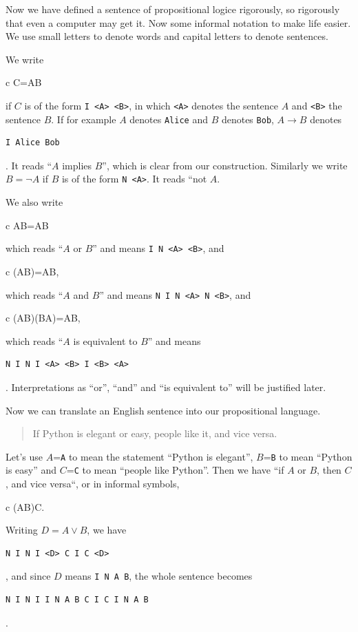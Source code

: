 \documentclass[11pt,oneside,%
]{memoir}
\newenvironment{eqna}{\begin{IEEEeqnarray}{c}}{\end{IEEEeqnarray}\ignorespacesafterend}
\theoremstyle{definition}
\begin{document}
Now we have defined a sentence of propositional logice rigorously, so rigorously that even a computer may get it. Now some informal notation to make life easier. We use small letters to denote words and capital letters to denote sentences.

We write
\begin{eqna}
    C=A\rightarrow B
\end{eqna}
if \(C\) is of the form \lstinline[language=propositio]!I <A> <B>!, in which \lstinline[language=propositio]!<A>! denotes the sentence \(A\) and \lstinline[language=propositio]!<B>! the sentence \(B\). If for example \(A\) denotes \lstinline[language=propositio]!Alice! and \(B\) denotes \lstinline[language=propositio]!Bob!, \(A\rightarrow B\) denotes
\begin{lstlisting}[language=propositio]
I Alice Bob
\end{lstlisting}
. It reads ``\(A\) implies \(B\)'', which is clear from our construction. Similarly we write \(B=\neg A\) if \(B\) is of the form \lstinline[language=propositio]!N <A>!. It reads ``not \(A\).

We also write
\begin{eqna}
    \neg A\rightarrow B=A\vee B
\end{eqna}
which reads ``\(A\) or \(B\)'' and means \lstinline[language=propositio]!I N <A> <B>!, and
\begin{eqna}
    \neg(\neg A\vee\neg B)=A\wedge B,
\end{eqna}
which reads ``\(A\) and \(B\)'' and means \lstinline[language=propositio]!N I N <A> N <B>!, and
\begin{eqna}
    (A\rightarrow B)\wedge(B\rightarrow A)=A\leftrightarrow B,
\end{eqna}
which reads ``\(A\) is equivalent to \(B\)'' and means
\begin{lstlisting}[language=propositio]
N I N I <A> <B> I <B> <A>
\end{lstlisting}
. Interpretations as ``or'', ``and'' and ``is equivalent to'' will be justified later.

Now we can translate an English sentence into our propositional language.
\begin{quote}
    If Python is elegant or easy, people like it, and vice versa.
\end{quote}
Let's use \(A\)=\lstinline[language=propositio]!A! to mean the statement ``Python is elegant'', \(B\)=\lstinline[language=propositio]!B! to mean ``Python is easy'' and \(C\)=\lstinline[language=propositio]!C! to mean ``people like Python''. Then we have ``if \(A\) or \(B\), then \(C\), and vice versa``, or in informal symbols,
\begin{eqna}
    (A\vee B)\leftrightarrow C.
\end{eqna}
Writing \(D=A\vee B\), we have
\begin{lstlisting}[language=propositio]
N I N I <D> C I C <D>
\end{lstlisting}
, and since \(D\) means \lstinline[language=propositio]!I N A B!, the whole sentence becomes
\begin{lstlisting}[language=propositio]
N I N I I N A B C I C I N A B
\end{lstlisting}
.
\end{document}
